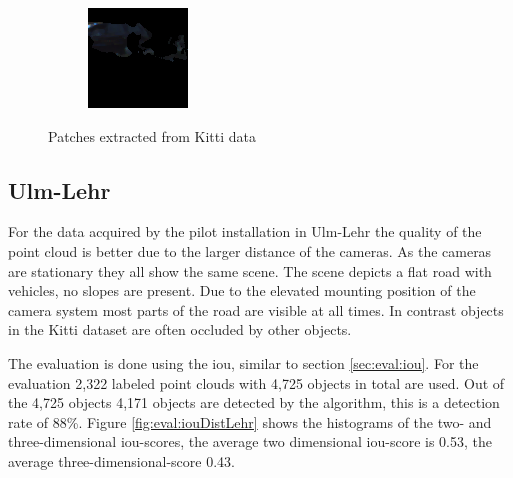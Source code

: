 \begin{figure}[h!]
\begin{subfigure}[c]{0.3\textwidth}
        \label{fig:eval:texture:0_1}
    \end{subfigure}
    \begin{subfigure}[c]{0.3\textwidth}
        \includegraphics[width=\textwidth]{../Material/texture0_2.png}
        \label{fig:eval:texture:0_2}
    \end{subfigure}
    \caption{Patches extracted from Kitti data}
    \label{fig:eval:texture}
\end{figure}

\subsection{Ulm-Lehr}
For the data acquired by the pilot installation in Ulm-Lehr the quality of the point cloud is better due to the larger distance of the cameras.
As the cameras are stationary they all show the same scene. The scene depicts a flat road with vehicles, no slopes are present. 
Due to the elevated mounting position of the camera system most parts of the road are visible at all times. 
In contrast objects in the Kitti dataset are often occluded by other objects.

The evaluation is done using the \ac{iou}, similar to section \ref{sec:eval:iou}. For the evaluation 2,322 labeled point clouds with 4,725 objects in total are used.
Out of the 4,725 objects 4,171 objects are detected by the algorithm, this is a detection rate of 88\%. 
Figure \ref{fig:eval:iouDistLehr} shows the histograms of the two- and three-dimensional \ac{iou}-scores, the average two dimensional \ac{iou}-score is 0.53, the average three-dimensional-score 0.43.

